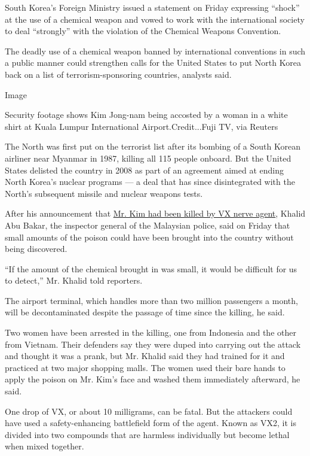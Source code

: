South Korea's Foreign Ministry issued a statement on Friday expressing
``shock'' at the use of a chemical weapon and vowed to work with the
international society to deal ``strongly'' with the violation of the
Chemical Weapons Convention.

The deadly use of a chemical weapon banned by international conventions
in such a public manner could strengthen calls for the United States to
put North Korea back on a list of terrorism-sponsoring countries,
analysts said.

Image

Security footage shows Kim Jong-nam being accosted by a woman in a white
shirt at Kuala Lumpur International Airport.Credit...Fuji TV, via
Reuters

The North was first put on the terrorist list after its bombing of a
South Korean airliner near Myanmar in 1987, killing all 115 people
onboard. But the United States delisted the country in 2008 as part of
an agreement aimed at ending North Korea's nuclear programs --- a deal
that has since disintegrated with the North's subsequent missile and
nuclear weapons tests.

After his announcement that
\href{https://www.nytimes.com/2017/02/23/world/asia/kim-jong-nam-vx-nerve-agent-.html?rref=collection\%2Fsectioncollection\%2Fasia\&action=click\&contentCollection=asia\&region=stream\&module=stream_unit\&version=latest\&contentPlacement=7\&pgtype=sectionfront}{Mr.
Kim had been killed by VX nerve agent}, Khalid Abu Bakar, the inspector
general of the Malaysian police, said on Friday that small amounts of
the poison could have been brought into the country without being
discovered.

``If the amount of the chemical brought in was small, it would be
difficult for us to detect,'' Mr. Khalid told reporters.

The airport terminal, which handles more than two million passengers a
month, will be decontaminated despite the passage of time since the
killing, he said.

Two women have been arrested in the killing, one from Indonesia and the
other from Vietnam. Their defenders say they were duped into carrying
out the attack and thought it was a prank, but Mr. Khalid said they had
trained for it and practiced at two major shopping malls. The women used
their bare hands to apply the poison on Mr. Kim's face and washed them
immediately afterward, he said.

One drop of VX, or about 10 milligrams, can be fatal. But the attackers
could have used a safety-enhancing battlefield form of the agent. Known
as VX2, it is divided into two compounds that are harmless individually
but become lethal when mixed together.

